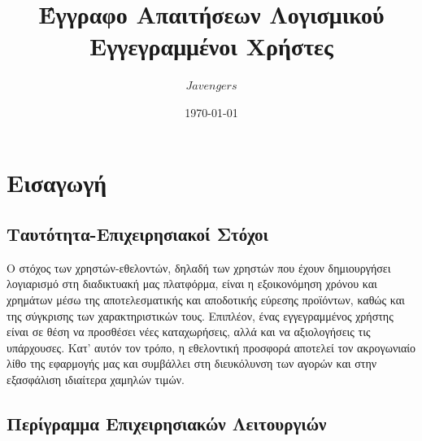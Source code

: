 \documentclass[12pt]{article}
\begin{document}
\title{Έγγραφο Aπαιτήσεων Λογισμικού \\
Εγγεγραμμένοι Χρήστες}
\date{\today}
\author{$Javengers$}
\maketitle

\tableofcontents

\clearpage

\section{Εισαγωγή}

\subsection{Ταυτότητα-Επιχειρησιακοί Στόχοι}


Ο στόχος των χρηστών-εθελοντών, δηλαδή των χρηστών που έχουν δημιουργήσει λογιαρισμό στη διαδικτυακή μας πλατφόρμα, είναι η εξοικονόμηση χρόνου και χρημάτων μέσω της αποτελεσματικής και αποδοτικής εύρεσης προϊόντων, καθώς και της σύγκρισης των χαρακτηριστικών τους. Επιπλέον, ένας εγγεγραμμένος χρήστης είναι σε θέση να προσθέσει νέες καταχωρήσεις, αλλά και να αξιολογήσεις τις υπάρχουσες. Κατ' αυτόν τον τρόπο, η εθελοντική προσφορά αποτελεί τον ακρογωνιαίο λίθο της εφαρμογής μας και συμβάλλει στη διευκόλυνση των αγορών και στην εξασφάλιση ιδιαίτερα χαμηλών τιμών.


\subsection{Περίγραμμα Επιχειρησιακών Λειτουργιών}
\end{document}
